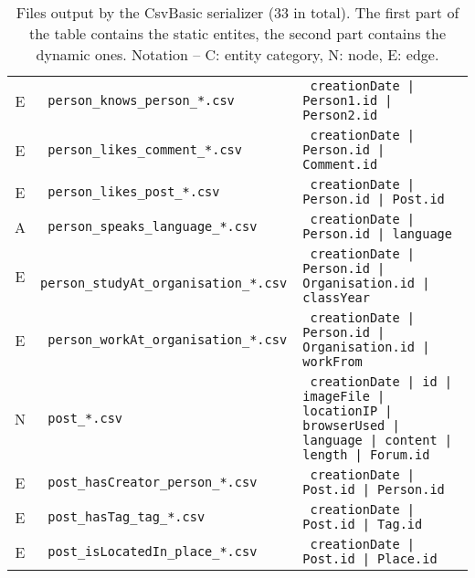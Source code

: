 \begin{table}[htb]
\begin{tabularx}{\linewidth}{|>{\sffamily}c|>{\tt}l|>{\tt}X|}
        E                    & person\_knows\_person\_*.csv            & creationDate | Person1.id | Person2.id                                                            \\
        E                    & person\_likes\_comment\_*.csv           & creationDate | Person.id | Comment.id                                                             \\
        E                    & person\_likes\_post\_*.csv              & creationDate | Person.id | Post.id                                                                \\
        A                    & person\_speaks\_language\_*.csv         & creationDate | Person.id | language                                                               \\
        E                    & person\_studyAt\_organisation\_*.csv    & creationDate | Person.id | Organisation.id | classYear                                            \\
        E                    & person\_workAt\_organisation\_*.csv     & creationDate | Person.id | Organisation.id | workFrom                                             \\
        \hline
        N                    & post\_*.csv                             & creationDate | id | imageFile | locationIP | browserUsed | language | content | length | Forum.id \\
        E                    & post\_hasCreator\_person\_*.csv         & creationDate | Post.id | Person.id                                                                \\
        E                    & post\_hasTag\_tag\_*.csv                & creationDate | Post.id | Tag.id                                                                   \\
        E                    & post\_isLocatedIn\_place\_*.csv         & creationDate | Post.id | Place.id                                                                 \\
        \hline
    \end{tabularx}
    \caption{Files output by the CsvBasic serializer (33 in total). The first part of the table contains the static entites, the second part contains the dynamic ones.
        Notation -- \textsf{C}: entity category, \textsf{N}: node, \textsf{E}: edge.}
    \label{table:csv_basic}
\end{table}
